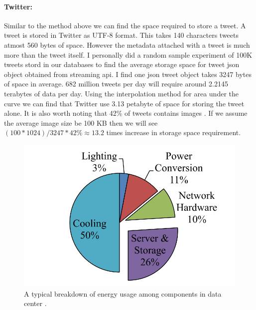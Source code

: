 \paragraph{Twitter:}
Similar to the method above we can find the space required to store a tweet. A tweet is stored in Twitter as UTF-8 format. This takes 140 characters tweets atmost 560 bytes of space. However the metadata attached with a tweet is much more than the tweet itself. I personally did a random sample experiment of 100K tweets stord in our databases to find the average storage space for tweet json object obtained from streaming api. I find one json tweet object takes 3247 bytes of space in average.
682 million tweets per day will require around 2.2145 terabytes of data per day. Using the interpolation method for area under the curve we can find that Twitter use 3.13 petabyte of space for storing the tweet alone. It is also worth noting that 42\% of tweets contains images \cite{tweets_images}. If we assume the average image size be 100 KB then we will see $(100 * 1024)/3247 * 42 \% \approx 13.2$ times increase in storage space requirement.

\begin{figure}[t]
	\includegraphics[width=0.7\linewidth ]{fig/energy_usage.png}
    \vspace{-2mm}
    \caption{A typical breakdown of energy usage among components in data center \cite{info2007top}.}
\end{figure}

